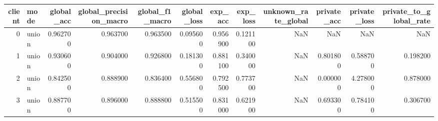 \begin{tabular}{rlrrrrrrrrrr}
\toprule
client & mode & global_acc & global_precision_macro & global_f1_macro & global_loss & exp_acc & exp_loss & unknown_rate_global & private_acc & private_loss & private_to_global_rate \\
\midrule
0 & union & 0.962700 & 0.963700 & 0.963500 & 0.095600 & 0.956900 & 0.121100 & NaN & NaN & NaN & NaN \\
1 & union & 0.930600 & 0.904000 & 0.926800 & 0.181300 & 0.881100 & 0.340000 & NaN & 0.801800 & 0.588700 & 0.198200 \\
2 & union & 0.842500 & 0.888900 & 0.836400 & 0.556800 & 0.792500 & 0.773700 & NaN & 0.000000 & 4.278000 & 0.878000 \\
3 & union & 0.887700 & 0.896000 & 0.888800 & 0.515500 & 0.831000 & 0.621900 & NaN & 0.693300 & 0.784100 & 0.306700 \\
\bottomrule
\end{tabular}
